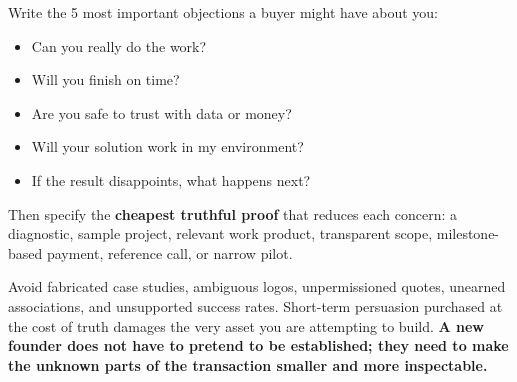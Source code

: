 Write the 5 most important objections a buyer might have about you:

\begin{itemize}[leftmargin=11pt,itemsep=1.5pt,topsep=1.5pt,parsep=0pt]
  \item Can you really do the work?
  \item Will you finish on time?
  \item Are you safe to trust with data or money?
  \item Will your solution work in my environment?
  \item If the result disappoints, what happens next?
\end{itemize}

Then specify the \textbf{cheapest truthful proof} that reduces each concern: a diagnostic, sample project, relevant work product, transparent scope, milestone-based payment, reference call, or narrow pilot.

Avoid fabricated case studies, ambiguous logos, unpermissioned quotes, unearned associations, and unsupported success rates. Short-term persuasion purchased at the cost of truth damages the very asset you are attempting to build. \textbf{A new founder does not have to pretend to be established; they need to make the unknown parts of the transaction smaller and more inspectable.}
